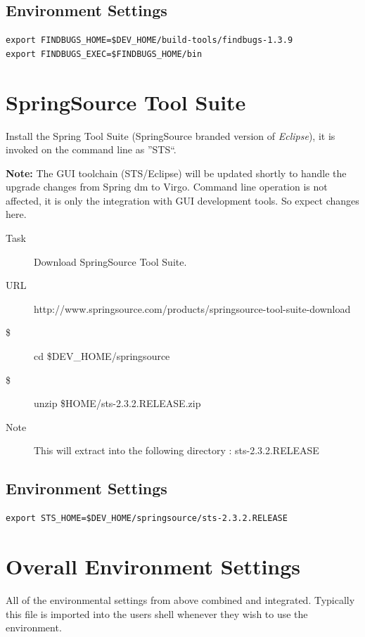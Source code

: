 \subsection{Environment Settings}
\begin{verbatim}
export FINDBUGS_HOME=$DEV_HOME/build-tools/findbugs-1.3.9
export FINDBUGS_EXEC=$FINDBUGS_HOME/bin
\end{verbatim}

\section{SpringSource Tool Suite}
Install the Spring Tool Suite (SpringSource branded version of \textit{Eclipse}),
 it is invoked on the command line as ''STS``.

\textbf{Note: } The GUI toolchain (STS/Eclipse) will be updated shortly to handle
the upgrade changes from Spring dm to Virgo. Command line operation is not affected,
it is only the integration with GUI development tools. So expect changes here. 

\begin{description}
\item[Task] Download SpringSource Tool Suite.
\item[URL] http://www.springsource.com/products/springsource-tool-suite-download
\item [\$] cd \$DEV\_HOME/springsource
\item [\$] unzip \$HOME/sts-2.3.2.RELEASE.zip
\item [Note] This will extract into the following directory : sts-2.3.2.RELEASE
\end{description}

\subsection{Environment Settings}
\begin{verbatim}
export STS_HOME=$DEV_HOME/springsource/sts-2.3.2.RELEASE
\end{verbatim}



\section{Overall Environment Settings}
All of the environmental settings from above combined and integrated. Typically
this file is imported into the users shell whenever they wish to use the environment.


